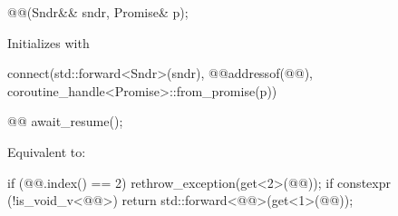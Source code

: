 \begin{itemdecl}
@@(Sndr&& sndr, Promise& p);
\end{itemdecl}

\begin{itemdescr}
\pnum
\effects
Initializes  with
\begin{codeblock}
connect(std::forward<Sndr>(sndr),
        @@{addressof(@@), coroutine_handle<Promise>::from_promise(p)})
\end{codeblock}
\end{itemdescr}

\begin{itemdecl}
@@ await_resume();
\end{itemdecl}

\begin{itemdescr}
\pnum
\effects
Equivalent to:
\begin{codeblock}
if (@@.index() == 2)
  rethrow_exception(get<2>(@@));
if constexpr (!is_void_v<@@>)
  return std::forward<@@>(get<1>(@@));
\end{codeblock}
\end{itemdescr}

